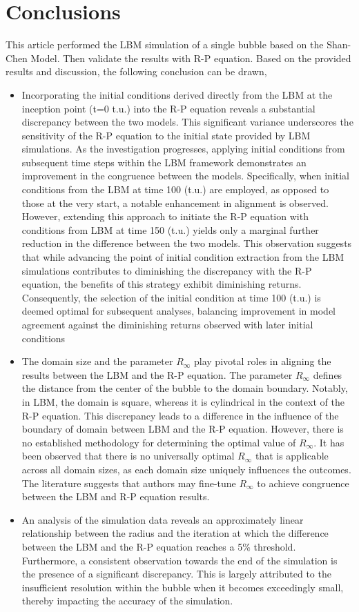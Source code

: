 \documentclass[review]{elsarticle}
\begin{document}
\section{Conclusions}
This article performed the LBM simulation of a single bubble based on the
Shan-Chen Model. Then validate the results with R-P equation. Based on the provided results and discussion, the following conclusion can be drawn,
\begin{itemize}
	\item Incorporating the initial conditions derived directly from the LBM at the inception point (t=0 t.u.) into the R-P equation reveals a substantial discrepancy between the two models. This significant variance underscores the sensitivity of the R-P equation to the initial state provided by LBM simulations. As the investigation progresses, applying initial conditions from subsequent time steps within the LBM framework demonstrates an improvement in the congruence between the models. Specifically, when initial conditions from the LBM at time 100 (t.u.) are employed, as opposed to those at the very start, a notable enhancement in alignment is observed. However, extending this approach to initiate the R-P equation with conditions from LBM at time 150 (t.u.) yields only a marginal further reduction in the difference between the two models. This observation suggests that while advancing the point of initial condition extraction from the LBM simulations contributes to diminishing the discrepancy with the R-P equation, the benefits of this strategy exhibit diminishing returns. Consequently, the selection of the initial condition at time 100 (t.u.) is deemed optimal for subsequent analyses, balancing improvement in model agreement against the diminishing returns observed with later initial conditions
	\item The domain size and the parameter \(R_{\infty}\) play pivotal roles in aligning the results between the LBM and the R-P equation. The parameter \(R_{\infty}\) defines the distance from the center of the bubble to the domain boundary. Notably, in LBM, the domain is square, whereas it is cylindrical in the context of the R-P equation. This discrepancy leads to a difference in the influence of the boundary of domain between LBM and the R-P equation. However, there is no established methodology for determining the optimal value of \(R_{\infty}\). It has been observed that there is no universally optimal \(R_{\infty}\) that is applicable across all domain sizes, as each domain size uniquely influences the outcomes. The literature suggests that authors may fine-tune $R_{\infty}$ to achieve congruence between the LBM and R-P equation results.
	\item An analysis of the simulation data reveals an approximately linear relationship between the radius and the iteration at which the difference between the LBM and the R-P equation reaches a 5\% threshold. Furthermore, a consistent observation towards the end of the simulation is the presence of a significant discrepancy. This is largely attributed to the insufficient resolution within the bubble when it becomes exceedingly small, thereby impacting the accuracy of the simulation.  
\end{itemize}
\end{document}
